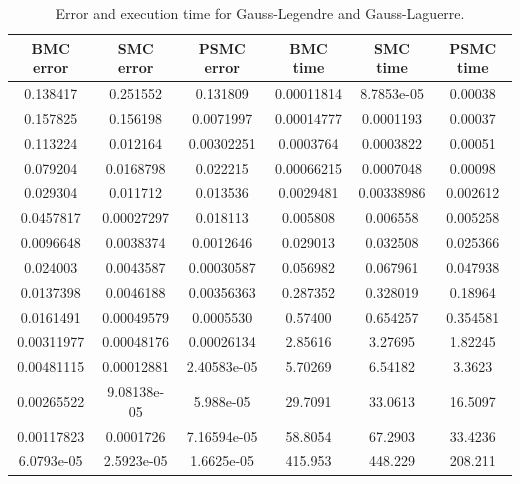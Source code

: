 \documentclass{article}
\begin{document}
    \begin{table}[ht] \label{tab:error-MonteCarlo}
    \centering
      \caption{Error and execution time for Gauss-Legendre and Gauss-Laguerre.}
      \vspace{2mm}
      \begin{tabular}{|c|c|c|c|c|c|}
        \hline
        BMC error & SMC error & PSMC error & BMC time & SMC time & PSMC time  \\
        \hline \hline
        0.138417 & 0.251552 & 0.131809 & 0.00011814 & 8.7853e-05 & 0.00038 \\
        0.157825 & 0.156198 & 0.0071997 & 0.00014777 & 0.0001193 & 0.00037 \\
        0.113224 & 0.012164 & 0.00302251 & 0.0003764 & 0.0003822 & 0.00051 \\
        0.079204 & 0.0168798 & 0.022215 & 0.00066215 & 0.0007048 & 0.00098 \\
        0.029304 & 0.011712 & 0.013536 & 0.0029481 & 0.00338986 & 0.002612 \\
        0.0457817 & 0.00027297 & 0.018113 & 0.005808 & 0.006558 & 0.005258 \\
        0.0096648 & 0.0038374 & 0.0012646 & 0.029013 & 0.032508 & 0.025366 \\
        0.024003 & 0.0043587 & 0.00030587 & 0.056982 & 0.067961 & 0.047938 \\
        0.0137398 & 0.0046188 & 0.00356363 & 0.287352 & 0.328019 & 0.18964 \\
        0.0161491 & 0.00049579 & 0.0005530 & 0.57400 & 0.654257 & 0.354581 \\
        0.00311977 & 0.00048176 & 0.00026134 & 2.85616 & 3.27695 & 1.82245 \\
        0.00481115 & 0.00012881 & 2.40583e-05 & 5.70269 & 6.54182 & 3.3623 \\
        0.00265522 & 9.08138e-05 & 5.988e-05 & 29.7091 & 33.0613 & 16.5097 \\
        0.00117823 & 0.0001726 & 7.16594e-05 & 58.8054 & 67.2903 & 33.4236 \\
        6.0793e-05 & 2.5923e-05 & 1.6625e-05 & 415.953 & 448.229 & 208.211 \\
        \hline
      \end{tabular} \\
      \hspace{0pt}\\
  \end{table}
\end{document}
